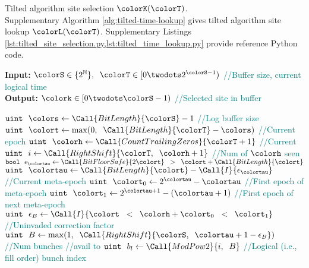\begin{algorithm}[H]
\caption{Tilted algorithm site selection $\colorK(\colorT)$.\\ \footnotesize Supplementary Algorithm \ref{alg:tilted-time-lookup} gives tilted algorithm site lookup $\colorL(\colorT)$. Supplementary Listings \cref{lst:tilted_site_selection.py,lst:tilted_time_lookup.py} provide reference Python code.}
\label{alg:tilted-site-selection}
\begin{minipage}{0.53\textwidth}
    \hspace*{\algorithmicindent} \textbf{Input:} $\colorS \in \{2^{\mathbb{N}}\},\;\; \colorT \in [0 \twodots 2^{\colorS - 1})$ \textcolor{teal}{\small//Buffer size, current logical time}\\
    \hspace*{\algorithmicindent} \textbf{Output:} $\colork \in [0 \twodots \colorS - 1)$ \textcolor{teal}{\small//Selected site in buffer}
    \begin{algorithmic}[1]
        \State $\texttt{uint} ~ ~ \colors \gets \Call{BitLength}{\colorS} - 1$ \textcolor{teal}{\small//Log buffer size}
        \State $\texttt{uint} ~ ~ \colort \gets \max(0,\;\; \Call{BitLength}{\colorT} - \colors)$ \textcolor{teal}{\small//Current epoch}
        \State $\texttt{uint} ~ ~ \colorh \gets \Call{CountTrailingZeros}{\colorT + 1}$ \textcolor{teal}{\small//Current \hv{}}
        \State $\texttt{uint} ~ ~ i \gets \Call{RightShift}{\colorT, \;\; \colorh + 1}$ \textcolor{teal}{\small//Num of \hv{} $\colorh$ seen}
        \State $\texttt{bool} ~ ~ \epsilon_{\colortau} \gets \Call{BitFloorSafe}{2\colort} \;\; > \;\; \colort + \Call{BitLength}{\colort}$
        \State $\texttt{uint} ~ ~ \colortau \gets  \Call{BitLength}{\colort} - \Call{I}{\epsilon_{\colortau}}$ \textcolor{teal}{\small//Current meta-epoch}
        \State $\texttt{uint} ~ ~ \colort_0 \gets 2^{\colortau} - \colortau$ \textcolor{teal}{\small//First epoch of meta-epoch}
        \State $\texttt{uint} ~ ~ \colort_1 \gets 2^{\colortau + 1} - (\colortau + 1)$ \textcolor{teal}{\small//First epoch of next meta-epoch}
        \State $\texttt{uint} ~ ~ \epsilon_B \gets \Call{I}{\colort \;\; < \;\; \colorh + \colort_0 \;\; < \;\; \colort_1}$ \textcolor{teal}{\small//Uninvaded correction factor}
        \State $\texttt{uint} ~ ~ B \gets \max(1,\;\; \Call{RightShift}{\colorS, \;\; \colortau + 1 - \epsilon_B})$ \textcolor{teal}{\small//Num bunches}
        \Statex \hspace{2.2in} \textcolor{teal}{\small//avail to \hv}
        \State $\texttt{uint} ~ ~ b_l \gets \Call{ModPow2}{i, \;\; B}$ \textcolor{teal}{\small//Logical (i.e., fill order) bunch index}

\end{algorithmic}
\end{minipage}
\end{algorithm}
